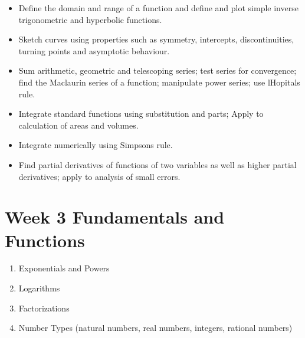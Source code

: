 \documentclass[]{article}
\begin{document}
\begin{itemize}
\item Define the domain and range of a function and define and plot simple inverse trigonometric and hyperbolic functions. 
\item Sketch curves using properties such as symmetry, intercepts, discontinuities, turning points and asymptotic behaviour. 
\item Sum arithmetic, geometric and telescoping series; test series for convergence; find the Maclaurin series of a function; manipulate power series; use lHopitals rule.
\item Integrate standard functions using substitution and parts; Apply to calculation of areas and volumes. 
\item Integrate numerically using Simpsons rule. 
\item Find partial derivatives of functions of two variables as well as higher partial derivatives; apply to analysis of small errors.
\end{itemize}

\newpage
\section{Week 3 Fundamentals and Functions}
\begin{enumerate}
	\item Exponentials and Powers
	\item Logarithms
	\item Factorizations
	\item Number Types (natural numbers, real numbers, integers, rational numbers)
\end{enumerate}
\newpage
\end{document}
